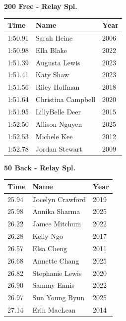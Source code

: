 \vspace{1.2em}
\noindent\begin{minipage}[t]{0.48\textwidth}
\centering
\textbf{\textcolor{teamprimary}{200 Free - Relay Spl.}}\par
\vspace{0.5em}
\centering
\small
\renewcommand{\arraystretch}{1.0}
\setlength{\tabcolsep}{4pt}
\begin{tabular}{@{}p{1.8cm}p{3.0cm}p{1.0cm}@{}}
\toprule
\textbf{Time} & \textbf{Name} & \textbf{Year} \\
\midrule
1:50.91 & Sarah Heine & 2006 \\
1:50.98 & Ella Blake & 2022 \\
1:51.39 & Augusta Lewis & 2023 \\
1:51.41 & Katy Shaw & 2023 \\
1:51.56 & Riley Hoffman & 2018 \\
1:51.64 & Christina Campbell & 2020 \\
1:51.95 & LillyBelle Deer & 2015 \\
1:52.50 & Allison Nguyen & 2025 \\
1:52.53 & Michele Kee & 2012 \\
1:52.78 & Jordan Stewart & 2009 \\
\bottomrule
\end{tabular}
\end{minipage}
\hfill
\begin{minipage}[t]{0.48\textwidth}
\centering
\textbf{\textcolor{teamprimary}{50 Back - Relay Spl.}}\par
\vspace{0.5em}
\centering
\small
\renewcommand{\arraystretch}{1.0}
\setlength{\tabcolsep}{4pt}
\begin{tabular}{@{}p{1.8cm}p{3.0cm}p{1.0cm}@{}}
\toprule
\textbf{Time} & \textbf{Name} & \textbf{Year} \\
\midrule
25.94 & Jocelyn Crawford & 2019 \\
25.98 & Annika Sharma & 2025 \\
26.22 & Jamee Mitchum & 2022 \\
26.28 & Kelly Ngo & 2017 \\
26.57 & Elsa Cheng & 2011 \\
26.68 & Annette Chang & 2025 \\
26.82 & Stephanie Lewis & 2020 \\
26.90 & Sammy Ennis & 2022 \\
26.97 & Sun Young Byun & 2025 \\
27.14 & Erin MacLean & 2014 \\
\bottomrule
\end{tabular}
\end{minipage}
